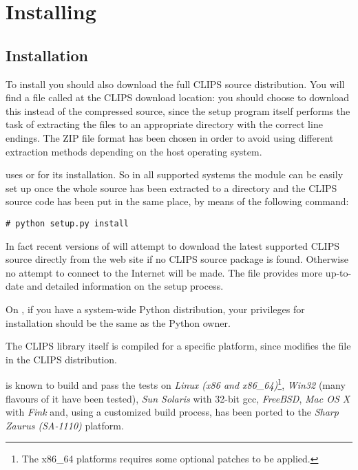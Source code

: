 \chapter{Installing \pyclips{}\label{pyclips-setup}}

\section{Installation\label{pyclips-setup-installation}}

To install \pyclips{} you should also download the full CLIPS source
distribution. You will find a file called  at the
CLIPS download location: you should choose to download this instead of
the \UNIX{} compressed source, since the setup program itself performs
the task of extracting the files to an appropriate directory with the
correct line endings. The ZIP file format has been chosen in order to
avoid using different extraction methods depending on the host operating
system.

\pyclips{} uses  or  for its
installation. So in all supported systems the module can be easily
set up once the whole source has been extracted to a directory and
the CLIPS source code has been put in the same place, by means of the
following command:

\begin{verbatim}
# python setup.py install
\end{verbatim}

In fact recent versions of \pyclips{} will attempt to download the
latest supported CLIPS source directly from the \pyclips{} web site
if no CLIPS source package is found. Otherwise no attempt to connect
to the Internet will be made. The  file provides more
up-to-date and detailed information on the setup process.

On \UNIX{}, if you have a system-wide Python distribution, your
privileges for installation should be the same as the Python owner.

The CLIPS library itself is compiled for a specific platform, since
 modifies the  file in the CLIPS
distribution. 

\pyclips{} is known to build and pass the tests on \emph{Linux (x86 and
x86_64)}\footnote{The x86_64 platforms requires some optional patches
to be applied.}, \emph{Win32} (many flavours of it have been tested),
\emph{Sun Solaris} with 32-bit gcc, \emph{FreeBSD}, \emph{Mac OS X} with
\emph{Fink} and, using a customized build process, has been ported to the
\emph{Sharp Zaurus (SA-1110)} platform.


